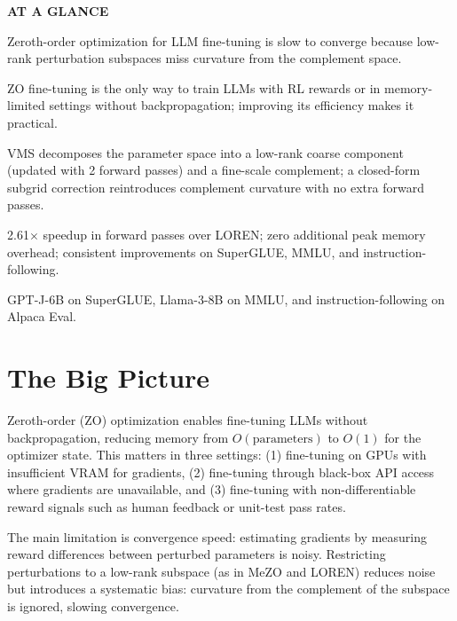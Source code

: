 \documentclass[10pt,twocolumn]{article}
\begin{document}
\begin{mdframed}[backgroundcolor=boxgray,linecolor=rulered,linewidth=1pt,
    innerleftmargin=6pt,innerrightmargin=6pt,
    innertopmargin=6pt,innerbottommargin=6pt]
\textbf{\small AT A GLANCE}\par\vspace{4pt}
\begin{description}[leftmargin=0pt,labelsep=4pt,itemsep=2pt,parsep=0pt,
    font=\small\bfseries]
  \item[Problem:] Zeroth-order optimization for LLM fine-tuning is slow
    to converge because low-rank perturbation subspaces miss curvature
    from the complement space.
  \item[Why it matters:] ZO fine-tuning is the only way to train LLMs
    with RL rewards or in memory-limited settings without backpropagation;
    improving its efficiency makes it practical.
  \item[Method:] VMS decomposes the parameter space into a low-rank
    coarse component (updated with 2 forward passes) and a fine-scale
    complement; a closed-form subgrid correction reintroduces complement
    curvature with no extra forward passes.
  \item[Result:] 2.61$\times$ speedup in forward passes over LOREN;
    zero additional peak memory overhead; consistent improvements on
    SuperGLUE, MMLU, and instruction-following.
  \item[Evidence:] GPT-J-6B on SuperGLUE, Llama-3-8B on MMLU, and
    instruction-following on Alpaca Eval.
\end{description}
\end{mdframed}

\section{The Big Picture}

Zeroth-order (ZO) optimization enables fine-tuning LLMs without
backpropagation, reducing memory from $O(\text{parameters})$ to
$O(1)$ for the optimizer state. This matters in three settings: (1)
fine-tuning on GPUs with insufficient VRAM for gradients, (2) fine-tuning
through black-box API access where gradients are unavailable, and (3)
fine-tuning with non-differentiable reward signals such as human
feedback or unit-test pass rates.

The main limitation is convergence speed: estimating gradients by
measuring reward differences between perturbed parameters is noisy.
Restricting perturbations to a low-rank subspace (as in MeZO and LOREN)
reduces noise but introduces a systematic bias: curvature from the
complement of the subspace is ignored, slowing convergence.
\end{document}
